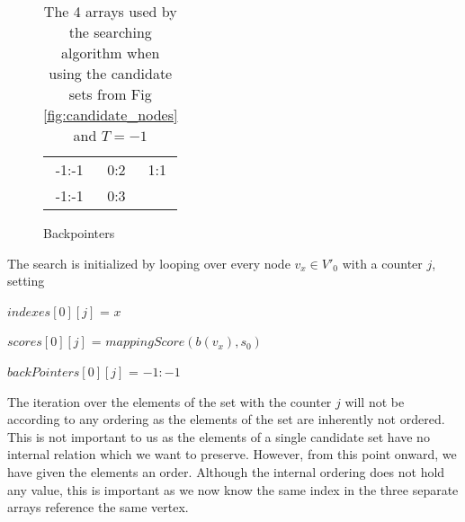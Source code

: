 \documentclass[thesis.tex]{subfiles}
\begin{document}
\begin{wraptable}{l}{0.5\textwidth}
\begin{mdframed}
\begin{subfigure}[b]{\textwidth}
\begin{center}
\begin{tabularx}{\textwidth}{ccc}
          \multicolumn{1}{|c|}{-1:-1} & 0:2 & \multicolumn{1}{|c|}{1:1} \\ \cline{1-3}
          \multicolumn{1}{|c|}{-1:-1} & 0:3 & \multicolumn{1}{|c}{ }  \\ \cline{1-2}
        \end{tabularx}
        \caption{Backpointers}
      \end{center}
    \end{subfigure}
  \end{mdframed}
  \caption[The 4 arrays used by the searching algorithm]{The 4 arrays used by the searching algorithm when using the candidate sets from Fig \ref{fig:candidate_nodes} and $T=-1$}
  \label{fig:scoring_arrays}
\end{wraptable}
The search is initialized by looping over every node $v_x \in V'_0$ with a counter $j$, setting\\
\par
$indexes[0][j]$ = $x$\par
$scores[0][j]$ = $mappingScore(b(v_x), s_0)$\par
$backPointers[0][j]$ = $-1:-1$\\
\par\noindent
The iteration over the elements of the set with the counter $j$ will not be according to any ordering as the elements of the set are inherently not ordered. This is not important to us as the elements of a single candidate set have no internal relation which we want to preserve. However, from this point onward, we have given the elements an order. Although the internal ordering does not hold any value, this is important as we now know the same index in the three separate arrays reference the same vertex.\\
\par\noindent
\end{document}
